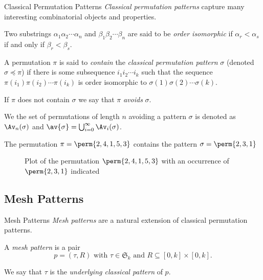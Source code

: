 \begin{frame}{Classical Permutation Patterns}
  \emph{Classical permutation patterns} capture many interesting combinatorial
  objects and properties.

  \begin{definition}
    Two substrings \(\alpha_1\alpha_2\dotsm\alpha_n\) and
    \(\beta_1\beta_2\dotsm\beta_n\) are said to be \emph{order isomorphic}
    if \(\alpha_r<\alpha_s\) if and only if \(\beta_r<\beta_s\).
  \end{definition}
\end{frame}

\begin{frame}
  \begin{definition}
    A permutation \(\pi\) is said to \emph{contain} the \emph{classical
    permutation pattern} \(\sigma\)
    (denoted \(\sigma \preceq \pi\)) if there is some
    subsequence \(i_1i_2\dotsm{}i_k\) such that the sequence
    \(\pi(i_1)\pi(i_2)\dotsm\pi(i_k)\) is order isomorphic to
    \(\sigma(1)\sigma(2)\dotsm\sigma(k)\).
  \end{definition}

  If \(\pi\) does not contain \(\sigma\) we say that \(\pi\) \emph{avoids}
  \(\sigma\).

  We the set of permutations of length \(n\) avoiding a pattern \(\sigma\) is
  denoted as \(\Av_n(\sigma)\) and
  \(\av{\sigma} = \bigcup_{i=0}^{\infty}\Av_i(\sigma)\).
\end{frame}

\begin{frame}
  \begin{example}
    The permutation \(\pi = \perm{2,4,1,5,3}\) contains the pattern
    \(\sigma = \perm{2,3,1}\)
    \begin{figure}[htb]
      \centering
      \caption{Plot of the permutation \(\perm{2,4,1,5,3}\) with an occurrence
      of \(\perm{2,3,1}\) indicated}
    \end{figure}
  \end{example}
\end{frame}

\subsection{Mesh Patterns}
\label{sub:Mesh Patterns}
\begin{frame}{Mesh Patterns}
  \emph{Mesh patterns} are a natural extension of classical permutation patterns.
  \begin{definition}
    A \emph{mesh pattern} is a pair
    \begin{equation*}
      p = (\tau,R)\text{ with } \tau \in \mathfrak{S}_k \text{ and } R \subseteq
      [0,k]\times [0,k].
    \end{equation*}
  \end{definition}
  We say that \(\tau\) is the \emph{underlying classical pattern} of \(p\).
\end{frame}

